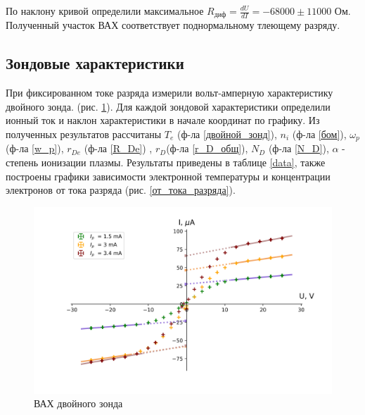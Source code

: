 \documentclass[a4paper,12pt]{article} %
\begin{document}
По наклону кривой определили максимальное $R_{диф}=\frac{dU}{dI} = -68000 \pm 11000$ Ом. Полученный участок ВАХ соответствует поднормальному тлеющему разряду.

\subsection{Зондовые характеристики} 
При фиксированном токе разряда измерили вольт-амперную характеристику двойного зонда. (рис. \ref{ВАХ_зонда}). Для каждой зондовой характеристики определили ионный ток и наклон характеристики в начале координат по графику. Из полученных результатов рассчитаны $T_e$ (ф-ла \ref{двойной_зонд}), $n_i$ (ф-ла \ref{бом}), $\omega_p$ (ф-ла \ref{w_p}), $r_{De}$ (ф-ла \ref{R_De}) , $r_D$(ф-ла \ref{r_D_общ}), $N_D$ (ф-ла \ref{N_D}), $\alpha$ - степень ионизации плазмы. Результаты приведены в таблице \ref{data}, также построены графики зависимости 
электронной температуры и концентрации электронов от тока разряда (рис. \ref{от_тока_разряда}).

\begin{figure}[h!]
\begin{center}
\includegraphics[width=\textwidth]{I(U)_probe}
\caption{ВАХ двойного зонда} \label{ВАХ_зонда}
\end{center}
\end{figure}
\end{document}
